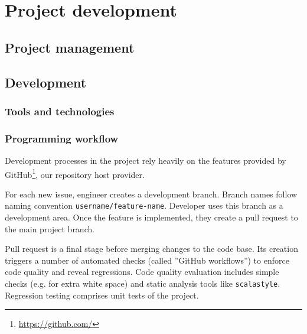 \chapter{Project development}
\label{chap:project-development}


\section{Project management}


\section{Development}

\subsection{Tools and technologies}


\subsection{Programming workflow}

Development processes in the project rely heavily on the features provided by GitHub\footnote{\href{https://github.com/}{https://github.com/}}, our repository host provider.

For each new issue, engineer creates a development branch. Branch names follow naming convention \texttt{username/feature-name}.
Developer uses this branch as a development area.
Once the feature is implemented, they create a pull request to the main project branch.

Pull request is a final stage before merging changes to the code base.
Its creation triggers a number of automated checks (called ''GitHub workflows'') to enforce code quality and reveal regressions.
Code quality evaluation includes simple checks (e.g. for extra white space) and static analysis tools like \texttt{scalastyle}.
Regression testing comprises unit tests of the project.

